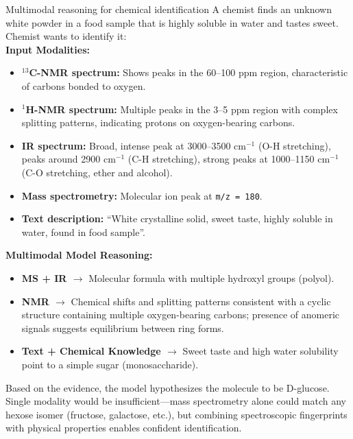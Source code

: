 \begin{examplebox}[label={example:multimodal}]{Multimodal reasoning for chemical identification}
A chemist finds an unknown white powder in a food sample that is highly soluble in water and tastes sweet. Chemist wants to identify it: \\
\textbf{Input Modalities:}
\begin{itemize}
    \item \textbf{$^{13}$C-NMR spectrum:} Shows peaks in the 60--100 ppm region, characteristic of carbons bonded to oxygen.
    
    \item \textbf{$^{1}$H-NMR spectrum:} Multiple peaks in the 3--5 ppm region with complex splitting patterns, indicating protons on oxygen-bearing carbons.
    
    \item \textbf{IR spectrum:} Broad, intense peak at 3000--3500 cm$^{-1}$ (O-H stretching), peaks around 2900 cm$^{-1}$ (C-H stretching), strong peaks at 1000--1150 cm$^{-1}$ (C-O stretching, ether and alcohol).
    
    \item \textbf{Mass spectrometry:} Molecular ion peak at \texttt{m/z = 180}.
    
    \item \textbf{Text description:} \enquote{White crystalline solid, sweet taste, highly soluble in water, found in food sample}.
    
\end{itemize}
\textbf{Multimodal Model Reasoning:}
\begin{itemize}
    \item \textbf{MS + IR $\rightarrow$} Molecular formula  with multiple hydroxyl groups (polyol).
    \item \textbf{NMR $\rightarrow$} Chemical shifts and splitting patterns consistent with a cyclic structure containing multiple oxygen-bearing carbons; presence of anomeric signals suggests equilibrium between ring forms.
    \item \textbf{Text + Chemical Knowledge $\rightarrow$} Sweet taste and high water solubility point to a simple sugar (monosaccharide).
\end{itemize}
Based on the evidence, the model hypothesizes the molecule to be D-glucose. Single modality would be insufficient---mass spectrometry alone could match any hexose isomer (fructose, galactose, etc.), but combining spectroscopic fingerprints with physical properties enables confident identification.
\end{examplebox}


